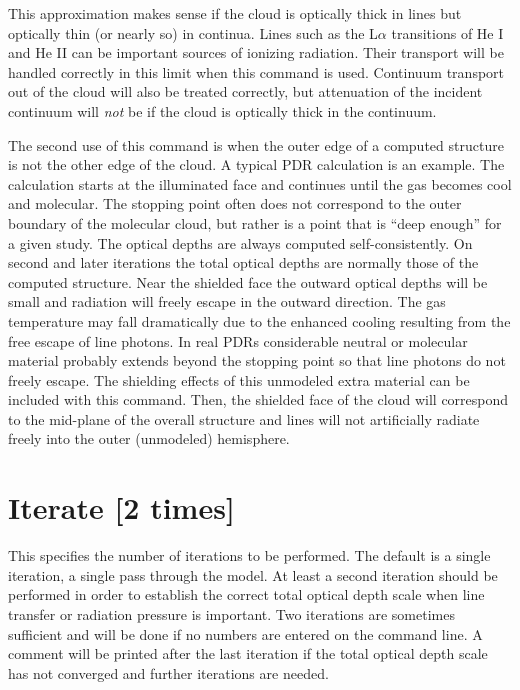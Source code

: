 This approximation makes sense if the cloud is optically thick in lines
but optically thin (or nearly so) in continua.
Lines such as the L$\alpha $
transitions of He I and He II can be important sources
of ionizing radiation.
Their transport will be handled correctly in this limit when this command
is used.
Continuum transport out of the cloud will also be treated
correctly, but attenuation of the incident continuum will
\emph{not} be if the
cloud is optically thick in the continuum.

The second use of this command is when the outer edge of a computed
structure is not the other edge of the cloud.
A typical PDR calculation
is an example.
The calculation starts at the illuminated face and continues
until the gas becomes cool and molecular.  The stopping point often does
not correspond to the outer boundary of the molecular cloud, but rather
is a point that is ``deep enough'' for a given study.  The optical depths
are always computed self-consistently.  On second and later iterations the
total optical depths are normally those of the computed structure.  Near
the shielded face the outward optical depths will be small and radiation
will freely escape in the outward direction.  The gas temperature may fall
dramatically due to the enhanced cooling resulting from the free escape
of line photons.
In real PDRs considerable neutral or molecular material
probably extends beyond the stopping point so that line photons do not freely escape.
The shielding effects of this unmodeled extra material can be
included with this command.
Then, the shielded face of the cloud will
correspond to the mid-plane of the overall structure and lines will not
artificially radiate freely into the outer (unmodeled) hemisphere.

\section{Iterate [2 times]}

This specifies the number of iterations to be performed.
The default
is a single iteration, a single pass through the model.
At least a second
iteration should be performed in order to establish the correct total optical
depth scale when line transfer or radiation pressure is important.
Two
iterations are sometimes sufficient and will be done if no numbers are
entered on the command line.
A comment will be printed after the last
iteration if the total optical depth scale has not converged and further
iterations are needed.

